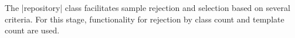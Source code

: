 The |repository| class facilitates sample rejection and selection based on
several criteria.
For this stage, functionality for rejection by class count and template count
are used.

